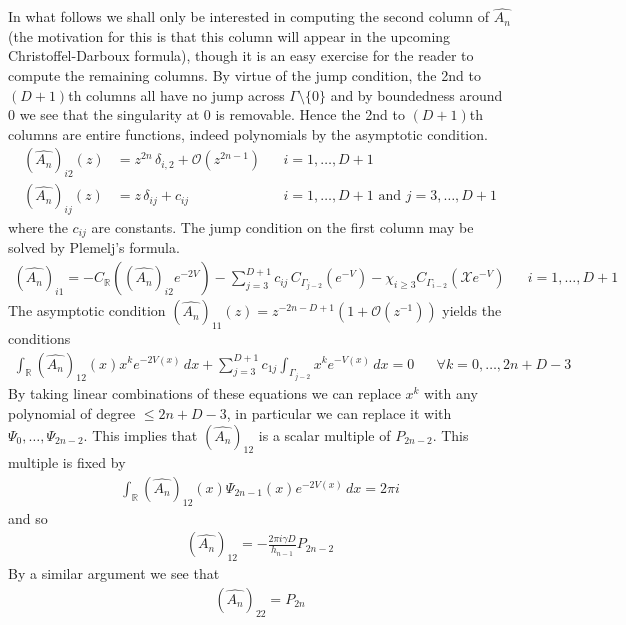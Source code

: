 \documentclass[12pt]{article}
\theoremstyle{definition}
\begin{document}
In what follows we shall only be interested in computing the second column of $\widehat{A_n}$ (the motivation for this is that this column will appear in the upcoming Christoffel-Darboux formula), though it is an easy exercise for the reader to compute the remaining columns. By virtue of the jump condition, the 2nd to $(D+1)$th columns all have no jump across $\Gamma \setminus \{ 0 \}$ and by boundedness around $0$ we see that the singularity at $0$ is removable. Hence the 2nd to $(D+1)$th columns are entire functions, indeed polynomials by the asymptotic condition. 
\begin{align*}
\left( \widehat{A_n} \right)_{i2} (z) &= z^{2n} \, \delta_{i,2}+\mathcal{O}(z^{2n-1}) & &  i=1, \dots, D+1 \\
\left( \widehat{A_n} \right)_{ij} (z) &= z \, \delta_{ij} + c_{ij} & &  i=1,\dots, D+1 \text{ and } j=3, \dots,D+1
\end{align*}
where the $c_{ij}$ are constants. The jump condition on the first column may be solved by Plemelj's formula.
\begin{align*}
\left( \widehat{A_n} \right)_{i1} = - C_\mathbb{R}\left( \left(\widehat{A_n}\right)_{i2} e^{-2V} \right)  - \sum_{j=3}^{D+1} c_{ij} \, C_{\Gamma_{j-2}}\left( e^{-V}\right) - \chi_{i \geq 3} C_{\Gamma_{i-2}}\left( \mathscr{X} e^{-V} \right) & &  i = 1, \dots,  D+1
\end{align*}
The asymptotic condition $\left( \widehat{A_n} \right)_{11}(z) = z^{-2n-D+1}(1 + \mathcal{O}(z^{-1}))$ yields the conditions
\begin{align*}
\int_\mathbb{R} \left(\widehat{A_n}\right)_{12}(x) x^k e^{-2V(x)}\, dx + \sum_{j=3}^{D+1} c_{1j} \int_{\Gamma_{j-2}} x^k e^{-V(x)}\, dx = 0 & & \forall k =0 , \dots, 2n+D-3
\end{align*}
By taking linear combinations of these equations we can replace $x^k$ with any polynomial of degree $\leq 2n+D-3$, in particular we can replace it with $\Psi_0, \dots, \Psi_{2n-2}$. This implies that $\left(\widehat{A_n}\right)_{12}$ is a scalar multiple of $P_{2n-2}$.  This multiple is fixed by
\begin{align*}
\int_\mathbb{R} \left(\widehat{A_n}\right)_{12}(x) \Psi_{2n-1}(x) e^{-2V(x)}\, dx = 2 \pi i 
\end{align*}
and so
\begin{align}\label{12Ahat}
\left(\widehat{A_n}\right)_{12} = - \frac{2\pi i \gamma D}{h_{n-1}} P_{2n-2}
\end{align}
By a similar argument we see that 
\begin{align}\label{22Ahat}
\left(\widehat{A_n}\right)_{22} = P_{2n}
\end{align}
\end{document}
